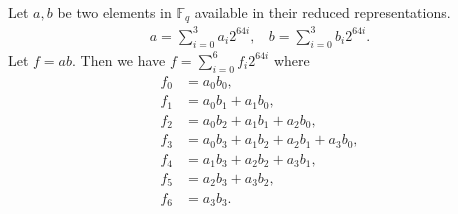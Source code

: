 \documentclass[a4paper, 12pt]{article}
\begin{document}
Let $a,b$ be two elements in $\mathbb{F}_q$ available in their reduced representations.
\begin{align*}
  a = \sum^{3}_{i=0} a_i 2^{64i}, \ \ \ \ b = \sum^{3}_{i=0} b_i 2^{64i}.
\end{align*}
Let $f = ab$. Then we have $f = \sum_{i=0}^{6} f_i 2^{64i}$ where
\begin{align*}
  f_0 & = a_0b_0,\\
  f_1 & = a_0b_1 + a_1b_0,\\
  f_2 & = a_0b_2 + a_1b_1 + a_2b_0,\\
  f_3 & = a_0b_3 + a_1b_2 + a_2b_1 + a_3b_0,\\
  f_4 & = a_1b_3 + a_2b_2 + a_3b_1,\\
  f_5 & = a_2b_3 + a_3b_2,\\
  f_6 & = a_3b_3.
\end{align*}
\end{document}
